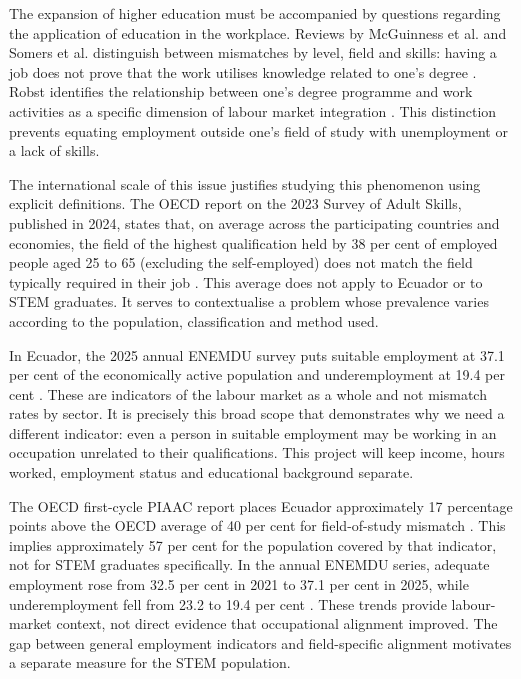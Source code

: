 The expansion of higher education must be accompanied by questions regarding the application of education in the workplace. Reviews by McGuinness et al. and Somers et al. distinguish between mismatches by level, field and skills: having a job does not prove that the work utilises knowledge related to one's degree \cite{McGuinness2018,Somers2019}. Robst identifies the relationship between one's degree programme and work activities as a specific dimension of labour market integration \cite{Robst2007}. This distinction prevents equating employment outside one's field of study with unemployment or a lack of skills.

The international scale of this issue justifies studying this phenomenon using explicit definitions. The OECD report on the 2023 Survey of Adult Skills, published in 2024, states that, on average across the participating countries and economies, the field of the highest qualification held by 38 per cent of employed people aged 25 to 65 (excluding the self-employed) does not match the field typically required in their job \cite{OECD2024}. This average does not apply to Ecuador or to STEM graduates. It serves to contextualise a problem whose prevalence varies according to the population, classification and method used.

In Ecuador, the 2025 annual ENEMDU survey puts suitable employment at 37.1 per cent of the economically active population and underemployment at 19.4 per cent \cite{InstitutoNacionaldeEstadsticayCensos2026}. These are indicators of the labour market as a whole and not mismatch rates by sector. It is precisely this broad scope that demonstrates why we need a different indicator: even a person in suitable employment may be working in an occupation unrelated to their qualifications. This project will keep income, hours worked, employment status and educational background separate.

The OECD first-cycle PIAAC report places Ecuador approximately 17 percentage points above the OECD average of 40 per cent for field-of-study mismatch \cite{OECD2019}. This implies approximately 57 per cent for the population covered by that indicator, not for STEM graduates specifically. In the annual ENEMDU series, adequate employment rose from 32.5 per cent in 2021 to 37.1 per cent in 2025, while underemployment fell from 23.2 to 19.4 per cent \cite{InstitutoNacionaldeEstadsticayCensos2026}. These trends provide labour-market context, not direct evidence that occupational alignment improved. The gap between general employment indicators and field-specific alignment motivates a separate measure for the STEM population.

